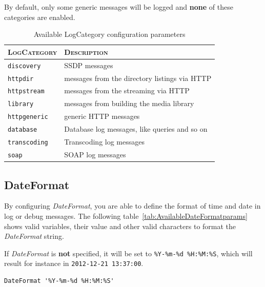 \documentclass[a4paper,oneside,10pt]{report}
\newenvironment{colframefile}{%
  \begin{Sbox}
    \begin{minipage}{.99\columnwidth}
}{%
  \end{minipage}
  \end{Sbox}
  \begin{center}
    \fcolorbox{black}{Yellow}{\TheSbox}
  \end{center}
}
\begin{document}
By default, only some generic messages will be logged and \textbf{none} of these categories are enabled.

\begin{table}
	\centering
	\begin{tabular}{|p{7em}|p{25em}|}
		\hline
		\textsc{LogCategory} & \textsc{Description}\\
		\hline
		\hline
		\verb|discovery| & SSDP messages \\
		\hline
		\verb|httpdir| & messages from the directory listings via HTTP \\
		\hline
		\verb|httpstream| & messages from the streaming via HTTP \\
		\hline
		\verb|library| & messages from building the media library \\
		\hline
		\verb|httpgeneric| & generic HTTP messages \\
		\hline
		\verb|database| & Database log messages, like queries and so on \\
		\hline
		\verb|transcoding| & Transcoding log messages \\
		\hline
		\verb|soap| & SOAP log messages \\
		\hline
	\end{tabular}
	\caption{Available LogCategory configuration parameters}
	\label{tab:AvailableLogCategoryparams}
\end{table}

\subsection{DateFormat}

By configuring {\em DateFormat}, you are able to define the format of time and date in log or debug messages. The following table~\ref{tab:AvailableDateFormatparams} shows valid variables, their value and other valid characters to format the {\em DateFormat} string.

If {\em DateFormat} is \textbf{not} specified, it will be set to \verb|%Y-%m-%d %H:%M:%S|, which will result for instance in \verb|2012-12-21 13:37:00|.

\begin{colframefile}
\begin{verbatim}
DateFormat '%Y-%m-%d %H:%M:%S'
\end{verbatim}
\end{colframefile}
\end{document}

